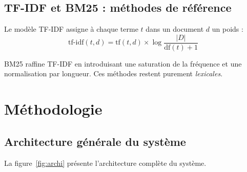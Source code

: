 \documentclass[12pt,a4paper]{article}
\begin{document}
\subsection{TF-IDF et BM25 : m\'{e}thodes de r\'{e}f\'{e}rence}

Le mod\`{e}le TF-IDF \cite{robertson2009bm25} assigne \`{a} chaque terme $t$ dans un document $d$ un poids :
\begin{equation}
\text{tf-idf}(t, d) = \text{tf}(t, d) \times \log \frac{|D|}{\text{df}(t) + 1}
\label{eq:tfidf}
\end{equation}

BM25 raffine TF-IDF en introduisant une saturation de la fr\'{e}quence et une normalisation par longueur. Ces m\'{e}thodes restent purement \textit{lexicales}.

\section{M\'{e}thodologie}
\label{sec:methodo}

\subsection{Architecture g\'{e}n\'{e}rale du syst\`{e}me}

La figure~\ref{fig:archi} pr\'{e}sente l'architecture compl\`{e}te du syst\`{e}me.
\end{document}
